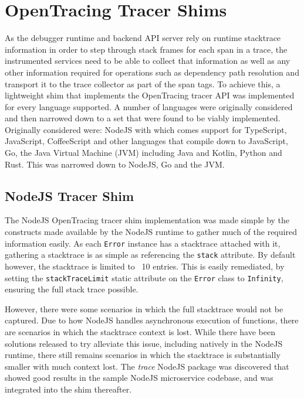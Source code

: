 \documentclass[12pt,pdftex,titlepage]{report}
\begin{document}
        \section{OpenTracing Tracer Shims}
            As the debugger runtime and backend API server rely on runtime stacktrace information in order to step through stack frames for each span in a trace, the instrumented services need to be able
            to collect that information as well as any other information required for operations such as dependency path resolution and transport it to the trace collector as part of the span tags.
            To achieve this, a lightweight shim that implements the OpenTracing tracer API was implemented for every language supported. A number of languages were originally considered and then narrowed
            down to a set that were found to be viably implemented. Originally considered were: NodeJS with which comes support for TypeScript, JavaScript, CoffeeScript and other languages that compile
            down to JavaScript, Go, the Java Virtual Machine (JVM) including Java and Kotlin, Python and Rust. This was narrowed down to NodeJS, Go and the JVM.

            \subsection{NodeJS Tracer Shim}
                The NodeJS OpenTracing tracer shim implementation was made simple by the constructs made available by the NodeJS runtime to gather much of the required information easily. As each \texttt{Error} 
                instance has a stacktrace attached with it, gathering a stacktrace is as simple as referencing the \texttt{stack} attribute. By default however, the stacktrace is limited to ~10 entries. This is
                easily remediated, by setting the \texttt{stackTraceLimit} static attribute on the \texttt{Error} class to \texttt{Infinity}, ensuring the full stack trace possible.

                However, there were some scenarios in which the full stacktrace would not be captured. Due to how NodeJS handles asynchronous execution of functions\cite{asyncnostack}, there are scenarios in which
                the stacktrace context is lost. While there have been solutions released to try alleviate this issue, including natively in the NodeJS runtime\cite{asyncstack}, there still remains scenarios in which
                the stacktrace is substantially smaller with much context lost. The \textit{trace}\cite{longtrace} NodeJS package was discovered that showed good results in the sample NodeJS microservice codebase, and was
                integrated into the shim thereafter.
\end{document}
